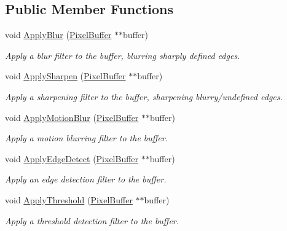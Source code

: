 \subsection*{Public Member Functions}
\begin{DoxyCompactItemize}
\item 
void \hyperlink{classimage__tools_1_1FilterManager_ab433819b81f5aea2940ccbd3342f37ab}{Apply\+Blur} (\hyperlink{classimage__tools_1_1PixelBuffer}{Pixel\+Buffer} $\ast$$\ast$buffer)
\begin{DoxyCompactList}\small\item\em Apply a blur filter to the buffer, blurring sharply defined edges. \end{DoxyCompactList}\item 
void \hyperlink{classimage__tools_1_1FilterManager_affd2d54947849f2be6c11585e1ce34b7}{Apply\+Sharpen} (\hyperlink{classimage__tools_1_1PixelBuffer}{Pixel\+Buffer} $\ast$$\ast$buffer)
\begin{DoxyCompactList}\small\item\em Apply a sharpening filter to the buffer, sharpening blurry/undefined edges. \end{DoxyCompactList}\item 
void \hyperlink{classimage__tools_1_1FilterManager_acd3651552af7abaeb4cf69ac90c62f0e}{Apply\+Motion\+Blur} (\hyperlink{classimage__tools_1_1PixelBuffer}{Pixel\+Buffer} $\ast$$\ast$buffer)
\begin{DoxyCompactList}\small\item\em Apply a motion blurring filter to the buffer. \end{DoxyCompactList}\item 
void \hyperlink{classimage__tools_1_1FilterManager_a111522b2042c253693195a73cb31a4a7}{Apply\+Edge\+Detect} (\hyperlink{classimage__tools_1_1PixelBuffer}{Pixel\+Buffer} $\ast$$\ast$buffer)
\begin{DoxyCompactList}\small\item\em Apply an edge detection filter to the buffer. \end{DoxyCompactList}\item 
void \hyperlink{classimage__tools_1_1FilterManager_aa62be1597d4a201a4a43fa62a462b2fc}{Apply\+Threshold} (\hyperlink{classimage__tools_1_1PixelBuffer}{Pixel\+Buffer} $\ast$$\ast$buffer)
\begin{DoxyCompactList}\small\item\em Apply a threshold detection filter to the buffer. \end{DoxyCompactList}\item 
$$
\end{DoxyCompactItemize}
